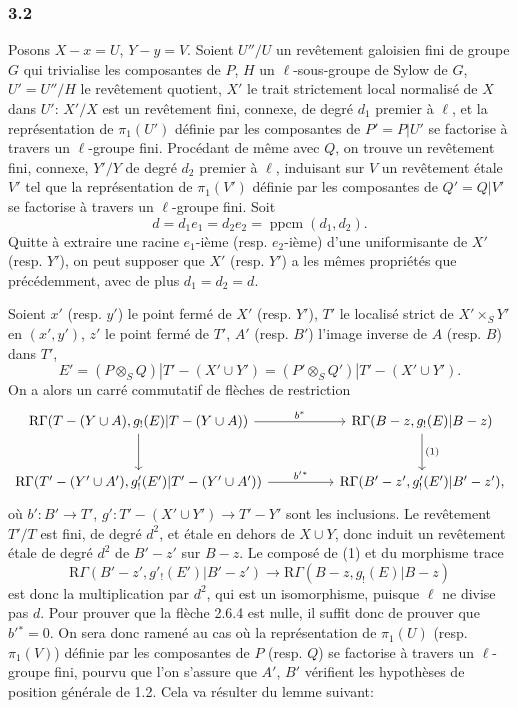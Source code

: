 \documentclass[11pt]{article}
\newcommand{\R}{\mathrm{R}}\newcommand{\RHomCore}{\mathrm{RHom}}
\providecommand{\R}{\mathrm R}
\begin{document}
\subsubsection*{3.2}
Posons $X-x=U$, $Y-y=V$. Soient $U''/U$ un revêtement galoisien fini de groupe $G$ qui trivialise les composantes de $P$, $H$ un $\ell$-sous-groupe de Sylow de $G$, $U'=U''/H$ le revêtement quotient, $X'$ le trait strictement local normalisé de $X$ dans $U'$: $X'/X$ est un revêtement fini, connexe, de degré $d_1$ premier à $\ell$, et la représentation de $\pi_1(U')$ définie par les composantes de $P'=P|U'$ se factorise à travers un $\ell$-groupe fini. Procédant de même avec $Q$, on trouve un revêtement fini, connexe, $Y'/Y$ de degré $d_2$ premier à $\ell$, induisant sur $V$ un revêtement étale $V'$ tel que la représentation de $\pi_1(V')$ définie par les composantes de $Q'=Q|V'$ se factorise à travers un $\ell$-groupe fini. Soit
\[
d=d_1e_1=d_2e_2=\operatorname{ppcm}(d_1,d_2).
\]
Quitte à extraire une racine $e_1$-ième (resp. $e_2$-ième) d'une uniformisante de $X'$ (resp. $Y'$), on peut supposer que $X'$ (resp. $Y'$) a les mêmes propriétés que précédemment, avec de plus $d_1=d_2=d$.

Soient $x'$ (resp. $y'$) le point fermé de $X'$ (resp. $Y'$), $T'$ le localisé strict de $X'\times_S Y'$ en $(x',y')$, $z'$ le point fermé de $T'$, $A'$ (resp. $B'$) l'image inverse de $A$ (resp. $B$) dans $T'$,
\[
E'=(P\otimes_S Q)|T'-(X'\cup Y')
   =(P'\otimes_S Q')|T'-(X'\cup Y').
\]
On a alors un carré commutatif de flèches de restriction
\[
\begin{tikzcd}[column sep=huge,row sep=large]
\R\Gamma(T-(Y\cup A),g_!(E)|T-(Y\cup A))
 \arrow[r,"b^*"] \arrow[d]
&
\R\Gamma(B-z,g_!(E)|B-z) \arrow[d,"(1)"]\\
\R\Gamma(T'-(Y'\cup A'),g'_!(E')|T'-(Y'\cup A'))
 \arrow[r,"b'{}^*"]
&
\R\Gamma(B'-z',g'_!(E')|B'-z') ,
\end{tikzcd}
\]
où $b':B'\to T'$, $g':T'-(X'\cup Y')\to T'-Y'$
sont les inclusions. Le revêtement $T'/T$ est fini, de degré $d^2$, et étale en dehors de $X\cup Y$, donc induit un revêtement étale de degré $d^2$ de $B'-z'$ sur $B-z$. Le composé de (1) et du morphisme trace
\[
\R\Gamma(B'-z',g'_!(E')|B'-z')
 \longrightarrow
\R\Gamma(B-z,g_!(E)|B-z)
\]
est donc la multiplication par $d^2$, qui est un isomorphisme, puisque $\ell$ ne divise pas $d$. Pour prouver que la flèche 2.6.4 est nulle, il suffit donc de prouver que $b'{}^*=0$. On sera donc ramené au cas où la représentation de $\pi_1(U)$ (resp. $\pi_1(V)$) définie par les composantes de $P$ (resp. $Q$) se factorise à travers un $\ell$-groupe fini, pourvu que l'on s'assure que $A'$, $B'$ vérifient les hypothèses de position générale de 1.2. Cela va résulter du lemme suivant:
\end{document}
